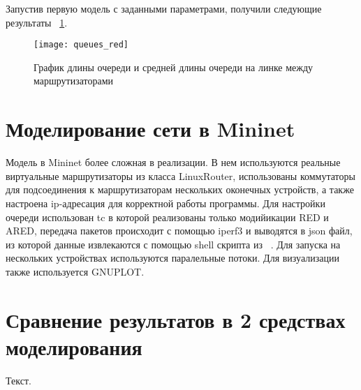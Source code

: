 Запустив первую модель с заданными параметрами, получили следующие результаты ~\ref{ch3:fig2}.

\begin{figure}[h!]
 \centerline{\texttt{[image: queues\_red]}}
 \caption{График длины очереди и средней длины очереди на линке между маршрутизаторами}
\label{ch3:fig2}
\end{figure}


\section{Моделирование сети в Mininet}
\label{chap3:sec2}

Модель в Mininet более сложная в реализации. В нем используются реальные виртуальные маршрутизаторы из класса LinuxRouter, использованы коммутаторы для подсоединения к маршрутизаторам нескольких оконечных устройств, а также настроена ip-адресация для корректной работы программы. Для настройки очереди использован tc в которой реализованы только модийикации RED и ARED, передача пакетов происходит с помощью iperf3 и выводятся в json файл, из которой данные извлекаются с помощью shell скрипта из ~\cite{iperf3-plotter}. Для запуска на нескольких устройствах используются паралельные потоки. Для визуализации также используется GNUPLOT.      

\section{Сравнение результатов в 2 средствах моделирования}
\label{chap3:sec3}

Текст.

